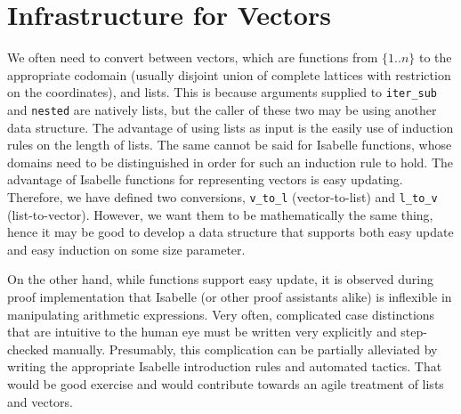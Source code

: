 \section{Infrastructure for Vectors}
We often need to convert between vectors, which are functions from $\{1..n\}$ to the appropriate codomain (usually disjoint union of complete lattices with restriction on the coordinates), and lists. This is because arguments supplied to \texttt{iter\_sub} and \texttt{nested} are natively lists, but the caller of these two may be using another data structure. The advantage of using lists as input is the easily use of induction rules on the length of lists. The same cannot be said for Isabelle functions, whose domains need to be distinguished in order for such an induction rule to hold. The advantage of Isabelle functions for representing vectors is easy updating. Therefore, we have defined two conversions, \texttt{v\_to\_l} (vector-to-list) and \texttt{l\_to\_v} (list-to-vector). However, we want them to be mathematically the same thing, hence it may be good to develop a data structure that supports both easy update and easy induction on some size parameter.

On the other hand, while functions support easy update, it is observed during proof implementation that Isabelle (or other proof assistants alike) is inflexible in manipulating arithmetic expressions. Very often, complicated case distinctions that are intuitive to the human eye must be written very explicitly and step-checked manually. Presumably, this complication can be partially alleviated by writing the appropriate Isabelle introduction rules and automated tactics. That would be good exercise and would contribute towards an agile treatment of lists and vectors.


